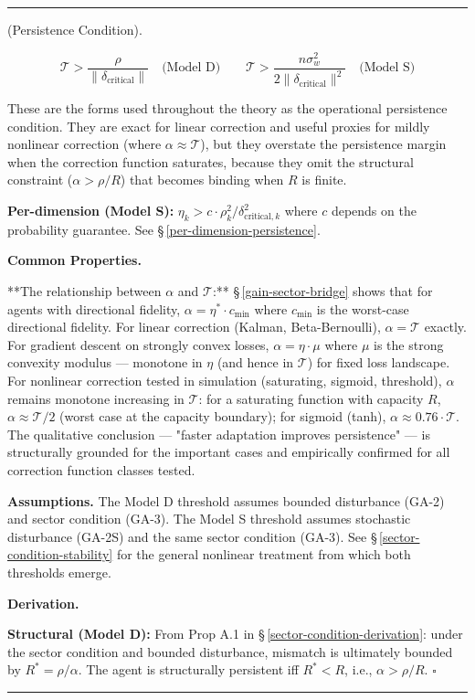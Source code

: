 \documentclass[11pt,oneside]{article}
\newcounter{claim}[section]
\renewcommand{\theclaim}{\thesection.\arabic{claim}}
\newenvironment{segment}[2]{%
  \refstepcounter{claim}%
  \bigskip\noindent\hrule\smallskip
  \noindent{\bfseries #1~\theclaim}\enskip(#2).\par\smallskip
  \noindent\ignorespaces
}{%
  \par\smallskip\noindent\hrule\bigskip
}
\newenvironment{theorem}[1][]{\begin{segment}{Theorem}{#1}}{\end{segment}}
\begin{document}
\begin{theorem}[Persistence Condition]
$$\mathcal{T} > \frac{\rho}{\lVert\delta_{\text{critical}}\rVert} \quad \text{(Model D)} \qquad \mathcal{T} > \frac{n\sigma_w^2}{2\lVert\delta_{\text{critical}}\rVert^2} \quad \text{(Model S)}$$

These are the forms used throughout the theory as the operational persistence condition. They are exact for linear correction and useful proxies for mildly nonlinear correction (where $\alpha \approx \mathcal{T}$), but they overstate the persistence margin when the correction function saturates, because they omit the structural constraint ($\alpha > \rho/R$) that becomes binding when $R$ is finite.

\textbf{Per-dimension (Model S):} $\eta_k > c \cdot \rho_k^2 / \delta_{\text{critical},k}^2$ where $c$ depends on the probability guarantee. See \S\,\ref{per-dimension-persistence}.


\medskip\noindent\textbf{Common Properties.}


**The relationship between $\alpha$ and $\mathcal{T}$:** \S\,\ref{gain-sector-bridge} shows that for agents with directional fidelity, $\alpha = \eta^* \cdot c_{\min}$ where $c_{\min}$ is the worst-case directional fidelity. For linear correction (Kalman, Beta-Bernoulli), $\alpha = \mathcal{T}$ exactly. For gradient descent on strongly convex losses, $\alpha = \eta \cdot \mu$ where $\mu$ is the strong convexity modulus — monotone in $\eta$ (and hence in $\mathcal{T}$) for fixed loss landscape. For nonlinear correction tested in simulation (saturating, sigmoid, threshold), $\alpha$ remains monotone increasing in $\mathcal{T}$: for a saturating function with capacity $R$, $\alpha \approx \mathcal{T} / 2$ (worst case at the capacity boundary); for sigmoid (tanh), $\alpha \approx 0.76 \cdot \mathcal{T}$. The qualitative conclusion — "faster adaptation improves persistence" — is structurally grounded for the important cases and empirically confirmed for all correction function classes tested.

\textbf{Assumptions.} The Model D threshold assumes bounded disturbance (GA-2) and sector condition (GA-3). The Model S threshold assumes stochastic disturbance (GA-2S) and the same sector condition (GA-3). See \S\,\ref{sector-condition-stability} for the general nonlinear treatment from which both thresholds emerge.


\medskip\noindent\textbf{Derivation.}


\textbf{Structural (Model D):} From Prop A.1 in \S\,\ref{sector-condition-derivation}: under the sector condition and bounded disturbance, mismatch is ultimately bounded by $R^* = \rho/\alpha$. The agent is structurally persistent iff $R^* < R$, i.e., $\alpha > \rho/R$. $\square$


\end{theorem}
\end{document}
